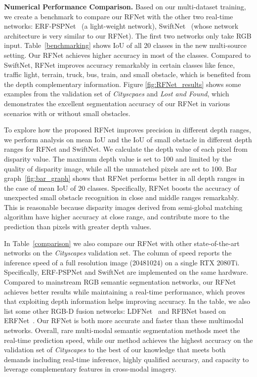\documentclass[letterpaper, 10 pt, journal, twoside]{ieeetran}
\begin{document}
\textbf{Numerical Performance Comparison.}
Based on our multi-dataset training, we create a benchmark to compare our RFNet with the other two real-time networks: ERF-PSPNet~\cite{ERF-PSPNet} (a light-weight network), SwiftNet~\cite{orsic2019defense} (whose network architecture is very similar to our RFNet). The first two networks only take RGB input. Table~\ref{benchmarking} shows IoU of all 20 classes in the new multi-source setting. Our RFNet achieves higher accuracy in most of the classes. Compared to SwiftNet, RFNet improves accuracy remarkably in certain classes like fence, traffic light, terrain, truck, bus, train, and small obstacle, which is benefited from the depth complementary information. Figure \ref{fig:RFNet_results} shows some examples from the validation set of \textit{Cityscpaes} and \textit{Lost and Found}, which demonstrates the excellent segmentation accuracy of our RFNet in various scenarios with or without small obstacles.


To explore how the proposed RFNet improves precision in different depth ranges, we perform analysis on mean IoU and the IoU of small obstacle in different depth ranges for RFNet and SwiftNet. We calculate the depth value of each pixel from disparity value. The maximum depth value is set to 100 and limited by the quality of disparity image, while all the unmatched pixels are set to 100. Bar graph~\ref{fig:bar_graph} shows that RFNet performs better in all depth ranges in the case of mean IoU of 20 classes. Specifically, RFNet boosts the accuracy of unexpected small obstacle recognition in close and middle ranges remarkably. This is reasonable because disparity images derived from semi-global matching algorithm have higher accuracy at close range, and contribute more to the prediction than pixels with greater depth values.


In Table~\ref{comparison} we also compare our RFNet with other state-of-the-art networks on the \textit{Cityscapes} validation set. The column of speed reports the inference speed of a full resolution image   (20481024) on a single RTX 2080Ti.
Specifically, ERF-PSPNet and SwiftNet are implemented on the same hardware.
Compared to mainstream RGB semantic segmentation networks, our RFNet achieves better results while maintaining a real-time performance, which proves that exploiting depth information helps improving accuracy.
In the table, we also list some other RGB-D fusion networks: LDFNet~\cite{hung2019incorporating} and RFBNet based on ERFNet~\cite{deng2019rfbnet}. Our RFNet is both more accurate and faster than these multimodal networks. Overall, rare multi-modal semantic segmentation methods meet the real-time prediction speed, while our method achieves the highest accuracy on the validation set of \textit{Cityscapes} to the best of our knowledge that meets both demands including real-time inference, highly qualified accuracy, and capacity to leverage complementary features in cross-modal imagery. 
\end{document}

